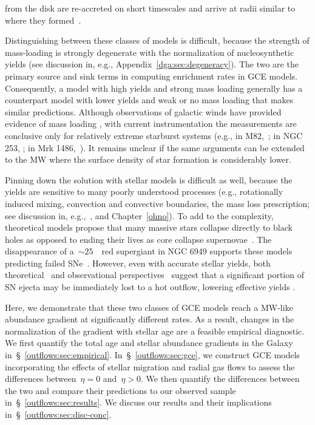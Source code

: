 from the disk are re-accreted on short timescales and arrive at radii similar
to where they formed~\citep{Melioli2008, Melioli2009, Spitoni2008, Spitoni2009}.
\par
Distinguishing between these classes of models is difficult, because the
strength of mass-loading is strongly degenerate with the normalization of
nucleosynthetic yields (see discussion in, e.g.,
Appendix~\ref{dga:sec:degeneracy}).
The two are the primary source and sink terms in computing enrichment rates in
GCE models.
Consequently, a model with high yields and strong mass loading generally
has a counterpart model with lower yields and weak or no mass loading that
makes similar predictions.
Although observations of galactic winds have provided evidence of mass loading
\citep[see, e.g., the review by][]{Veilleux2020}, with current
instrumentation the measurements are conclusive only for relatively extreme
starburst systems (e.g., in M82,~\citealt{Lopez2020}; in NGC 253,
\citealt{Lopez2023}; in Mrk 1486,~\citealt{Cameron2021}).
It remains unclear if the same arguments can be extended to the MW where the
surface density of star formation is considerably lower.
\par
Pinning down the solution with stellar models is difficult as well, because the
yields are sensitive to many poorly understood processes (e.g., rotationally
induced mixing, convection and convective boundaries, the mass loss
prescription; see discussion in, e.g.,~\citealt{Romano2010, Griffith2021b,
Gil-Pons2022}, and Chapter~\ref{ohno}).
To add to the complexity, theoretical models propose that many massive stars
collapse directly to black holes as opposed to ending their lives as core
collapse supernovae~\citep[CCSNe;][]{OConnor2011, Pejcha2015, Ertl2016,
Sukhbold2016}.
The disappearance of a~$\sim$$25$~\msun~red supergiant in NGC 6949 supports
these models predicting failed SNe~\citep{Gerke2015, Adams2017, Basinger2021}.
However, even with accurate stellar yields, both theoretical~\citep{Peeples2011,
Christensen2018} and observational perspectives~\citep{Chisholm2018,
Cameron2021} suggest that a significant portion of SN ejecta may be immediately
lost to a hot outflow, lowering effective yields
\citep[see also][]{Dalcanton2007}.
\par
Here, we demonstrate that these two classes of GCE models reach a MW-like
abundance gradient at significantly different rates.
As a result, changes in the normalization of the gradient with stellar age are
a feasible empirical diagnostic.
We first quantify the total age and stellar abundance gradients in the Galaxy
in~\S~\ref{outflows:sec:empirical}.
In~\S~\ref{outflows:sec:gce}, we construct GCE models incorporating the effects
of stellar migration and radial gas flows to assess the differences
between~$\eta = 0$ and~$\eta > 0$.
We then quantify the differences between the two and compare their predictions
to our observed sample in~\S~\ref{outflows:sec:results}.
We discuss our results and their implications
in~\S~\ref{outflows:sec:disc-conc}.

